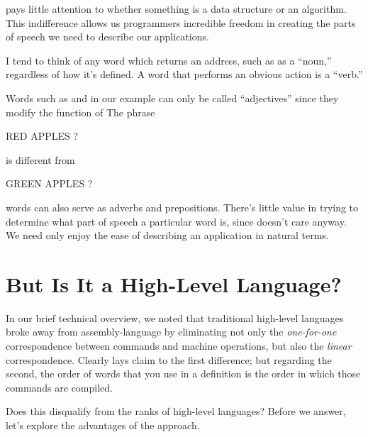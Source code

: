 \Forth{} pays little attention to whether something is a data structure
or an algorithm. This indifference allows us programmers incredible
freedom in creating the parts of speech we need to describe our
applications.

I tend to think of any word which returns an address, such as
 as a ``noun,'' regardless of how it's defined. A word
that performs an obvious action is a ``verb.''

Words such as  and  in our example can only be
called ``adjectives'' since they modify the function of
 The phrase

\begin{Code}
RED APPLES ?
\end{Code}
is different from

\begin{Code}
GREEN APPLES ?
\end{Code}
\Forth{} words can also serve as adverbs and prepositions. There's little
value in trying to determine what part of speech a particular word is,
since \Forth{} doesn't care anyway. We need only enjoy the ease of
describing an application in natural terms.%
%


\section{But Is It a High-Level Language?}%
%
In our brief technical overview, we noted that traditional high-level
languages broke away from assembly-language by eliminating not only
the \emph{one-for-one} correspondence between commands and machine
operations, but also the \emph{linear} correspondence. Clearly \Forth{}
lays claim to the first difference; but regarding the second, the
order of words that you use in a definition is the order in which
those commands are compiled.

Does this disqualify \Forth{} from the ranks of high-level languages?
Before we answer, let's explore the advantages of the \Forth{} approach.


